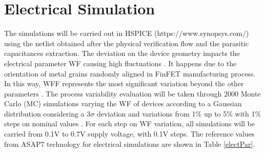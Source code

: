 \documentclass[pgmicro,mestrado,english]{iiufrgs}
\begin{document}
\section{Electrical Simulation}

The simulations will be carried out in HSPICE (https://www.synopsys.com/) using the netlist obtained after the physical verification flow and the parasitic capacitances extraction. The deviation on the device geometry impacts the electrical parameter WF causing high fluctuations \cite{zimpeck2016finfet}. It happens due to the orientation of metal grains randomly aligned in FinFET manufacturing process. In this way, WFF represents the most significant variation beyond the other parameters \cite{meinhardt2014impact}. The process variability evaluation will be taken through 2000 Monte Carlo (MC) simulations \cite{alioto2015variations} varying the WF of devices according to a Gaussian distribution considering a 3\(\sigma\) deviation and variations from 1\% up to 5\% with 1\% steps on nominal values \cite{nawaz2014comparison}. For each step on WF variation, all simulations will be carried from 0.1V to 0.7V supply voltage, with 0.1V steps. The reference values from ASAP7 technology for electrical simulations are shown in Table \ref{electPar}.
\end{document}
